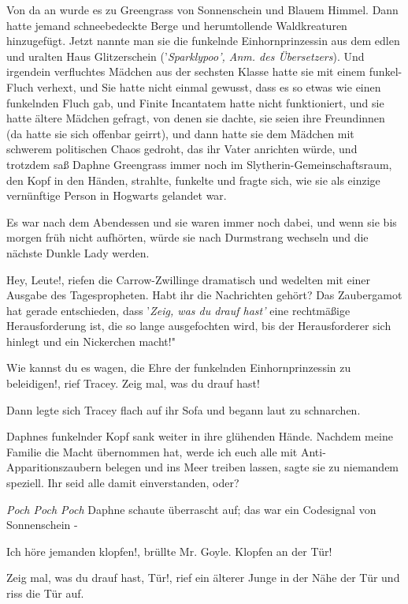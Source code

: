 Von da an wurde es zu Greengrass von Sonnenschein und Blauem Himmel. Dann hatte
jemand schneebedeckte Berge und herumtollende Waldkreaturen hinzugefügt. Jetzt
nannte man sie die funkelnde Einhornprinzessin aus dem edlen und uralten Haus
Glitzerschein ('\emph{Sparklypoo', Anm. des Übersetzers}). Und irgendein
verfluchtes Mädchen aus der sechsten Klasse hatte sie mit einem funkel-Fluch
verhext, und Sie hatte nicht einmal gewusst, dass es so etwas wie einen
funkelnden Fluch gab, und Finite Incantatem hatte nicht funktioniert, und sie
hatte ältere Mädchen gefragt, von denen sie dachte, sie seien ihre Freundinnen
(da hatte sie sich offenbar geirrt), und dann hatte sie dem Mädchen mit schwerem
politischen Chaos gedroht, das ihr Vater anrichten würde, und trotzdem saß
Daphne Greengrass immer noch im Slytherin-Gemeinschaftsraum, den Kopf in den
Händen, strahlte, funkelte und fragte sich, wie sie als einzige vernünftige
Person in Hogwarts gelandet war.

Es war nach dem Abendessen und sie waren immer noch dabei, und wenn sie bis
morgen früh nicht aufhörten, würde sie nach Durmstrang wechseln und die nächste
Dunkle Lady werden.

\glqq Hey, Leute!\grqq{}, riefen die Carrow-Zwillinge dramatisch und wedelten
mit einer Ausgabe des Tagespropheten. \glqq Habt ihr die Nachrichten gehört? Das
Zaubergamot hat gerade entschieden, dass '\emph{Zeig, was du drauf hast'} eine
rechtmäßige Herausforderung ist, die so lange ausgefochten wird, bis der
Herausforderer sich hinlegt und ein Nickerchen macht!"

\glqq Wie kannst du es wagen, die Ehre der funkelnden Einhornprinzessin zu
beleidigen!\grqq{}, rief Tracey. \glqq Zeig mal, was du drauf hast!\grqq{}

Dann legte sich Tracey flach auf ihr Sofa und begann laut zu schnarchen.

Daphnes funkelnder Kopf sank weiter in ihre glühenden Hände. \glqq Nachdem meine
Familie die Macht übernommen hat, werde ich euch alle mit
Anti-Apparitionszaubern belegen und ins Meer treiben lassen\grqq{}, sagte sie zu
niemandem speziell. \glqq Ihr seid alle damit einverstanden, oder?\grqq{}

\emph{Poch Poch Poch}
Daphne schaute überrascht auf; das war ein Codesignal von Sonnenschein -

\glqq Ich höre jemanden klopfen!\grqq{}, brüllte Mr. Goyle. \glqq Klopfen an der
Tür!\grqq{}

\glqq Zeig mal, was du drauf hast, Tür!\grqq{}, rief ein älterer Junge in der
Nähe der Tür und riss die Tür auf.

